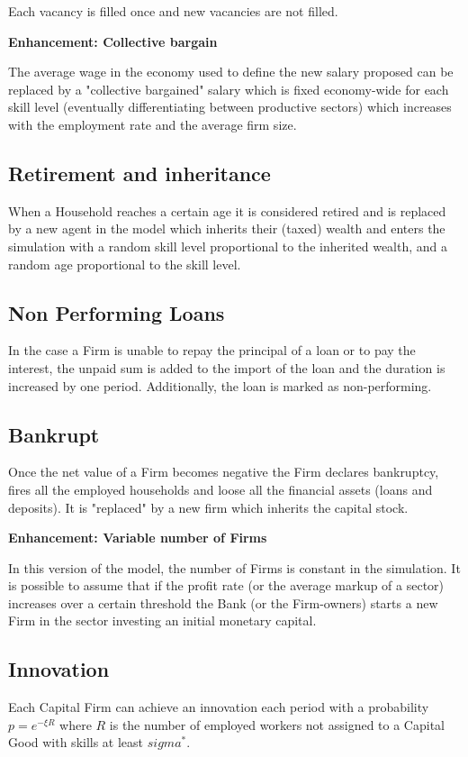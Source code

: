 \documentclass[a4paper, headings=standardclasses]{scrartcl}
\newenvironment{enh}[1][]{\begin{framed}\noindent\textbf{Enhancement: #1}\par}{\end{framed}}
\begin{document}
Each vacancy is filled once and new vacancies are not filled.

\begin{enh}[Collective bargain]
	The average wage in the economy used to define the new salary proposed can be replaced by a "collective bargained" salary which is fixed economy-wide for each skill level (eventually differentiating between productive sectors) which increases with the employment rate and the average firm size.
\end{enh}

\subsection{Retirement and inheritance}
When a Household reaches a certain age it is considered retired and is replaced by a new agent in the model which inherits their (taxed) wealth and enters the simulation with a random skill level proportional to the inherited wealth, and a random age proportional to the skill level.

\subsection{Non Performing Loans}
In the case a Firm is unable to repay the principal of a loan or to pay the interest, the unpaid sum is added to the import of the loan and the duration is increased by one period. Additionally, the loan is marked as non-performing.

\subsection{Bankrupt}
Once the net value of a Firm becomes negative the Firm declares bankruptcy, fires all the employed households and loose all the financial assets (loans and deposits). It is "replaced" by a new firm which inherits the capital stock.

\begin{enh}[Variable number of Firms]
	In this version of the model, the number of Firms is constant in the simulation. It is possible to assume that if the profit rate (or the average markup of a sector) increases over a certain threshold the Bank (or the Firm-owners) starts a new Firm in the sector investing an initial monetary capital.
\end{enh}

\subsection{Innovation}
Each Capital Firm can achieve an innovation each period with a probability $p = e^{-\xi R}$ where $R$ is the number of employed workers not assigned to a Capital Good with skills at least $sigma^*$.
\end{document}
